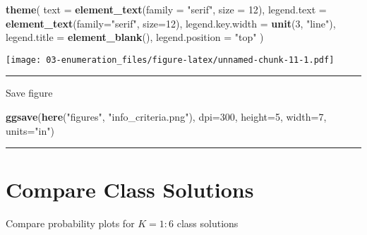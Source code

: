 \documentclass[
]{book}
\newenvironment{Shaded}{\begin{snugshade}}{\end{snugshade}}
\newcommand{\AttributeTok}[1]{\textcolor[rgb]{0.13,0.29,0.53}{#1}}
\newcommand{\DecValTok}[1]{\textcolor[rgb]{0.00,0.00,0.81}{#1}}
\newcommand{\FunctionTok}[1]{\textcolor[rgb]{0.13,0.29,0.53}{\textbf{#1}}}
\newcommand{\NormalTok}[1]{#1}
\newcommand{\StringTok}[1]{\textcolor[rgb]{0.31,0.60,0.02}{#1}}
\begin{document}
\begin{Shaded}
\begin{Highlighting}[]
  \FunctionTok{theme}\NormalTok{(}
    \AttributeTok{text =} \FunctionTok{element\_text}\NormalTok{(}\AttributeTok{family =} \StringTok{"serif"}\NormalTok{, }\AttributeTok{size =} \DecValTok{12}\NormalTok{),}
    \AttributeTok{legend.text =} \FunctionTok{element\_text}\NormalTok{(}\AttributeTok{family=}\StringTok{"serif"}\NormalTok{, }\AttributeTok{size=}\DecValTok{12}\NormalTok{),}
    \AttributeTok{legend.key.width =} \FunctionTok{unit}\NormalTok{(}\DecValTok{3}\NormalTok{, }\StringTok{"line"}\NormalTok{),}
    \AttributeTok{legend.title =} \FunctionTok{element\_blank}\NormalTok{(),}
    \AttributeTok{legend.position =} \StringTok{"top"}  
\NormalTok{  )}
\end{Highlighting}
\end{Shaded}

\texttt{[image: 03-enumeration\_files/figure-latex/unnamed-chunk-11-1.pdf]}

\begin{center}\rule{0.5\linewidth}{0.5pt}\end{center}

Save figure

\begin{Shaded}
\begin{Highlighting}[]
\FunctionTok{ggsave}\NormalTok{(}\FunctionTok{here}\NormalTok{(}\StringTok{"figures"}\NormalTok{, }\StringTok{"info\_criteria.png"}\NormalTok{), }\AttributeTok{dpi=}\DecValTok{300}\NormalTok{, }\AttributeTok{height=}\DecValTok{5}\NormalTok{, }\AttributeTok{width=}\DecValTok{7}\NormalTok{, }\AttributeTok{units=}\StringTok{"in"}\NormalTok{)}
\end{Highlighting}
\end{Shaded}

\begin{center}\rule{0.5\linewidth}{0.5pt}\end{center}

\section{Compare Class Solutions}\label{compare-class-solutions}

Compare probability plots for \(K = 1:6\) class solutions
\end{document}

